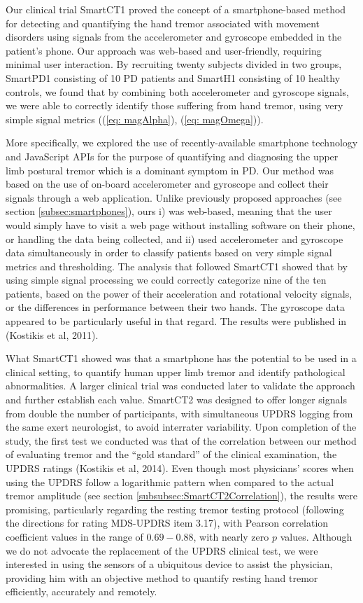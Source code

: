 Our clinical trial \gls{SmartCT1} proved the concept of a smartphone-based method for detecting and quantifying the hand tremor associated with movement disorders using signals from the accelerometer and gyroscope embedded in the patient's phone. Our approach was web-based and user-friendly, requiring minimal user interaction. By recruiting twenty subjects divided in two groups, \gls{SmartPD1} consisting of 10 \gls{PD} patients and \gls{SmartH1} consisting of 10 healthy controls, we found that by combining both accelerometer and gyroscope signals, we were able to correctly identify those suffering from hand tremor, using very simple signal metrics ((\ref{eq: magAlpha}), (\ref{eq: magOmega})). 

More specifically, we explored the use of recently-available smartphone technology and JavaScript \gls{API}s for the purpose of quantifying and diagnosing the upper limb postural tremor which is a dominant symptom in \gls{PD}. Our method was based on the use of on-board accelerometer and gyroscope and collect their signals through a web application. Unlike previously proposed approaches (see section \ref{subsec:smartphones}), ours i) was web-based, meaning that the user would simply have to visit a web page without installing software on their phone, or handling the data being collected, and ii) used accelerometer and gyroscope data simultaneously in order to classify patients based on very simple signal metrics and thresholding. The analysis that followed \gls{SmartCT1} showed that by using simple signal processing we could correctly categorize nine of the ten patients, based on the power of their acceleration and rotational velocity signals, or the differences in performance between their two hands. The gyroscope data appeared to be particularly useful in that regard. The results were published in (Kostikis et al, 2011). 

What \gls{SmartCT1} showed was that a smartphone has the potential to be used in a clinical setting, to quantify human upper limb tremor and identify pathological abnormalities. A larger clinical trial was conducted later to validate the approach and further establish each value. \gls{SmartCT2} was designed to offer longer signals from double the number of participants, with simultaneous \gls{UPDRS} logging from the same exert neurologist, to avoid interrater variability. Upon completion of the study, the first test we conducted was that of the correlation between our method of evaluating tremor and the ``gold standard'' of the clinical examination, the \gls{UPDRS} ratings (Kostikis et al, 2014). Even though most physicians' scores when using the \gls{UPDRS} follow a logarithmic pattern when compared to the actual tremor amplitude (see section \ref{subsubsec:SmartCT2Correlation}), the results were promising, particularly regarding the resting tremor testing protocol (following the directions for rating \gls{MDS}-\gls{UPDRS} item 3.17), with Pearson correlation coefficient values in the range of $0.69 - 0.88$, with nearly zero $p$ values. Although we do not advocate the replacement of the \gls{UPDRS} clinical test, we were interested in using the sensors of a ubiquitous device to assist the physician, providing him with an objective method to quantify resting hand tremor efficiently, accurately and remotely. 

